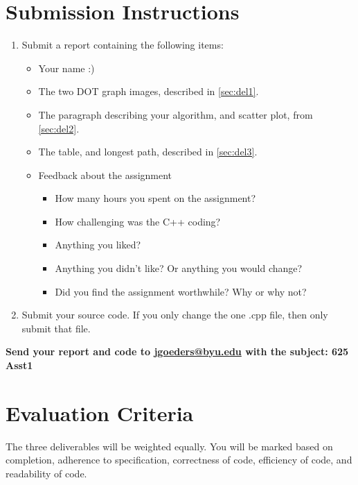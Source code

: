 \section{Submission Instructions}

\begin{enumerate}
	\item 

Submit a report containing the following items:
\begin{itemize}
	\item Your name :)
	\item The two DOT graph images, described in \cref{sec:del1}.
	\item The paragraph describing your algorithm, and scatter plot, from \cref{sec:del2}.
	\item The table, and longest path, described in \cref{sec:del3}.
	\item Feedback about the assignment
	
	\begin{itemize}
		\item How many hours you spent on the assignment?  
		\item How challenging was the C++ coding?
		\item Anything you liked?
		\item Anything you didn't like? Or anything you would change?
		\item Did you find the assignment worthwhile? Why or why not?
	\end{itemize}
\end{itemize}

\item Submit your source code.  If you only change the one .cpp file, then only submit that file.
\end{enumerate}


\textbf{Send your report and code to \href{mailto:jgoeders@byu.edu}{jgoeders@byu.edu} with the subject: 625 Asst1}

\section{Evaluation Criteria}
The three deliverables will be weighted equally.  You will be marked based on completion, adherence to specification, correctness of code, efficiency of code, and readability of code.





